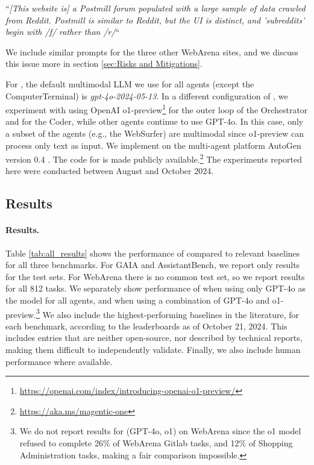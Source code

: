 ``\emph{[This website is] a Postmill forum populated with a large sample of data crawled from Reddit. Postmill is similar to Reddit, but the UI is distinct, and 'subreddits' begin with /f/ rather than /r/}``

We include similar prompts for the three other WebArena sites, and we discuss this issue more in section \ref{sec:Risks and Mitigations}.

For \team, the default multimodal LLM we use for all agents (except the ComputerTerminal) is \textit{gpt-4o-2024-05-13}. In a different configuration of \team, we experiment with using OpenAI o1-preview\footnote{\url{https://openai.com/index/introducing-openai-o1-preview/}} for the outer loop of the Orchestrator and for the Coder, while other agents continue to use GPT-4o. In this case, only a subset of the agents (e.g., the WebSurfer) are multimodal since o1-preview can process only text as input. We implement \team on the multi-agent platform AutoGen version 0.4 \cite{wu2023autogen}. The code for \team is made publicly available.\footnote{\url{https://aka.ms/magentic-one}} The experiments reported here were conducted between August and October 2024. 

\subsection{Results}
\label{sec:Results}

\paragraph{Results.} Table \ref{tab:all_results} shows the performance of \team  compared to relevant baselines for all three benchmarks. For GAIA and AssistantBench, we report only results for the test sets. For WebArena there is no common test set, so we report results for all 812 tasks. We separately show performance of \team when using only GPT-4o as the model for all agents, and when using a combination of GPT-4o and o1-preview.\footnote{We do not report results for \team (GPT-4o, o1) on WebArena since the o1 model refused to complete 26\% of WebArena Gitlab tasks, and 12\% of Shopping Administration tasks, making a fair comparison impossible.} We also include the highest-performing baselines in the literature, for each benchmark, according to the leaderboards as of October 21, 2024. This includes entries that are neither open-source, nor described by technical reports, making them difficult to independently validate. Finally, we also include human performance where available.

